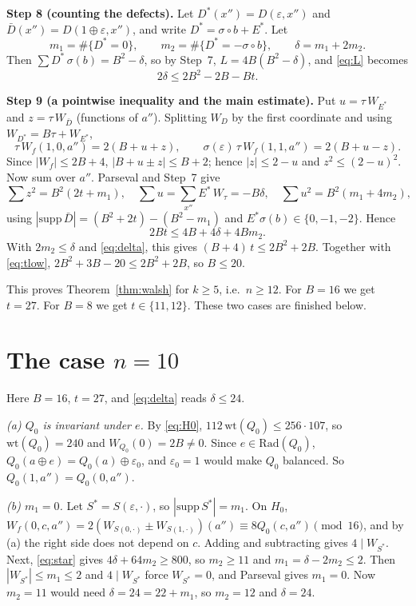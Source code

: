 \documentclass[11pt]{amsart}
\theoremstyle{remark}
\newcommand{\W}{W}
\newcommand{\sg}{\sigma}
\newcommand{\wt}{\mathrm{wt}}
\newcommand{\Rad}{\mathrm{Rad}}
\begin{document}
\smallskip\noindent\textbf{Step 8 (counting the defects).}
Let $D^*(x'')=D(\varepsilon,x'')$ and $\bar D(x'')=D(1\oplus\varepsilon,x'')$, and write
$D^*=\sg\circ b+E^*$. Let
\[
  m_1=\#\{D^*=0\},\qquad m_2=\#\{D^*=-\sg\circ b\},\qquad \delta=m_1+2m_2 .
\]
Then $\sum D^*\,\sg(b)=B^2-\delta$, so by Step~7, $L=4B(B^2-\delta)$, and \eqref{eq:L} becomes
\begin{equation}\label{eq:delta}
  2\delta\le 2B^2-2B-Bt .
\end{equation}

\smallskip\noindent\textbf{Step 9 (a pointwise inequality and the main estimate).}
Put $u=\tau\,\W_{E^*}$ and $z=\tau\,\W_{\bar D}$ (functions of $a''$). Splitting $\W_D$ by
the first coordinate and using $\W_{D^*}=B\tau+\W_{E^*}$,
\[
  \tau\,\W_f(1,0,a'')=2(B+u+z),\qquad \sg(\varepsilon)\,\tau\,\W_f(1,1,a'')=2(B+u-z).
\]
Since $|\W_f|\le 2B+4$, $|B+u\pm z|\le B+2$; hence $|z|\le 2-u$ and $z^2\le(2-u)^2$. Now sum
over $a''$. Parseval and Step~7 give
\[
  \textstyle\sum z^2=B^2(2t+m_1),\quad \sum u=\sum_{x''}E^*\,\W_\tau=-B\delta,\quad
  \sum u^2=B^2(m_1+4m_2),
\]
using $|\mathrm{supp}\,\bar D|=(B^2+2t)-(B^2-m_1)$ and $E^*\sg(b)\in\{0,-1,-2\}$. Hence
\begin{equation}\label{eq:star}
  2Bt\le 4B+4\delta+4Bm_2 .\tag{$\star$}
\end{equation}
With $2m_2\le\delta$ and \eqref{eq:delta}, this gives $(B+4)\,t\le 2B^2+2B$. Together with
\eqref{eq:tlow}, $2B^2+3B-20\le 2B^2+2B$, so $B\le 20$.

\smallskip
This proves Theorem~\ref{thm:walsh} for $k\ge5$, i.e.\ $n\ge 12$. For $B=16$ we get
$t=27$. For $B=8$ we get $t\in\{11,12\}$. These two cases are finished below.

\section{The case $n=10$}\label{sec:ten}

Here $B=16$, $t=27$, and \eqref{eq:delta} reads $\delta\le 24$.

\emph{(a) $Q_0$ is invariant under $e$.} By \eqref{eq:H0}, $112\,\wt(Q_0)\le 256\cdot107$, so
$\wt(Q_0)=240$ and $\W_{Q_0}(0)=2B\ne0$. Since $e\in\Rad(Q_0)$, $Q_0(a\oplus e)=Q_0(a)\oplus\varepsilon_0$,
and $\varepsilon_0=1$ would make $Q_0$ balanced. So $Q_0(1,a'')=Q_0(0,a'')$.

\emph{(b) $m_1=0$.} Let $S^*=S(\varepsilon,\cdot)$, so $|\mathrm{supp}\,S^*|=m_1$. On $H_0$,
$\W_f(0,c,a'')=2(\W_{S(0,\cdot)}\pm\W_{S(1,\cdot)})(a'')\equiv 8Q_0(c,a'')\pmod{16}$, and by (a) the
right side does not depend on $c$. Adding and subtracting gives $4\mid\W_{S^*}$. Next,
\eqref{eq:star} gives $4\delta+64m_2\ge 800$, so $m_2\ge 11$ and $m_1=\delta-2m_2\le2$. Then
$|\W_{S^*}|\le m_1\le2$ and $4\mid\W_{S^*}$ force $\W_{S^*}=0$, and Parseval gives $m_1=0$.
Now $m_2=11$ would need $\delta=24=22+m_1$, so $m_2=12$ and $\delta=24$.
\end{document}
